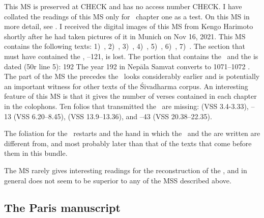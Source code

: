 \mysubsubsection{\msM}
This MS is preserved at CHECK and has no access number CHECK.
I have collated the readings of this MS only for \VSS\ 
chapter one as a test.
On this MS in more detail, see .
I received the digital images of this MS from Kengo Harimoto
shortly after he had taken pictures of it in Munich on  Nov 16, 2021. 
This MS contains the following texts:
1)~\SDhS, 
2)~\SDhU, 
3)~, 
4)~,
5)~\Vss, 
6)~,
7)~. 
The section that must have contained the , --121, is lost. The portion that
contains the \VSS\ and the \skttitle{Dharmaputrikā}{Dharmaputrika}
is dated (\fol50r line 5):  192  The year 192 in Nepāla Samvat converts to 
1071--1072 \CE. The part of the MS the precedes the \VSS\ looks
considerably earlier and is potentially an important witness for
other texts of the Śivadharma corpus. An interesting 
feature of this MS is that it gives the number of verses contained in
each chapter in the colophons. Ten folios that transmitted the \VSS\
are missing: 
\fol5 (VSS 3.4-3.33),
--13 (VSS 6.20--8.45),
 (VSS 13.9--13.36), and
--43 (VSS 20.38--22.35). 

The foliation for the \VSS\ restarts
and the hand in which the \VSS\ and the  are written are different from, and
most probably later than that of the texts that come 
before them in this bundle. 

The MS rarely gives interesting readings for the reconstruction of
the \VSS, and in general does not seem to be superior 
to any of the MSS described above. 


\medskip
\subsection{The Paris manuscript}

